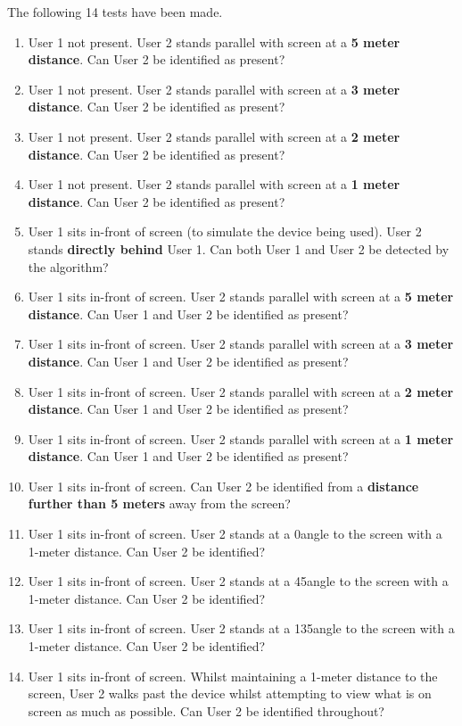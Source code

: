 \documentclass[12pt]{article}
\theoremstyle{plain}
\theoremstyle{definition}
\begin{document}
The following 14 tests have been made. 
\begin{enumerate}
    \item User 1 not present. User 2 stands parallel with screen at a \textbf{5 meter distance}. Can User 2 be identified as present?
    \item User 1 not present. User 2 stands parallel with screen at a \textbf{3 meter distance}. Can User 2 be identified as present?
    \item User 1 not present. User 2 stands parallel with screen at a \textbf{2 meter distance}. Can User 2 be identified as present?
    \item User 1 not present. User 2 stands parallel with screen at a \textbf{1 meter distance}. Can User 2 be identified as present?
    \item User 1 sits in-front of screen (to simulate the device being used). User 2 stands \textbf{directly behind} User 1. Can both User 1 and User 2 be detected by the algorithm?
    \item User 1 sits in-front of screen. User 2 stands parallel with screen at a \textbf{5 meter distance}. Can User 1 and User 2 be identified as present?
    \item User 1 sits in-front of screen. User 2 stands parallel with screen at a \textbf{3 meter distance}. Can User 1 and User 2 be identified as present?
    \item User 1 sits in-front of screen. User 2 stands parallel with screen at a \textbf{2 meter distance}. Can User 1 and User 2 be identified as present?
    \item User 1 sits in-front of screen. User 2 stands parallel with screen at a \textbf{1 meter distance}. Can User 1 and User 2 be identified as present?
    \item User 1 sits in-front of screen. Can User 2 be identified from a \textbf{distance further than 5 meters} away from the screen?
    \item User 1 sits in-front of screen. User 2 stands at a 0\degree angle to the screen with a 1-meter distance. Can User 2 be identified?
    \item User 1 sits in-front of screen. User 2 stands at a 45\degree angle to the screen with a 1-meter distance. Can User 2 be identified?
    \item User 1 sits in-front of screen. User 2 stands at a 135\degree angle to the screen with a 1-meter distance. Can User 2 be identified?
    \item User 1 sits in-front of screen. Whilst maintaining a 1-meter distance to the screen, User 2 walks past the device whilst attempting to view what is on screen as much as possible. Can User 2 be identified throughout?
\end{enumerate}
\end{document}
